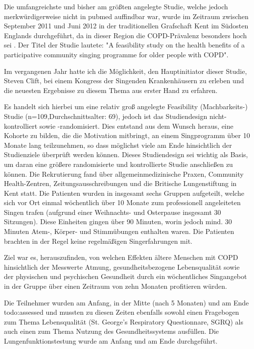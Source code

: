 Die umfangreichste und bisher am größten angelegte Studie, welche jedoch merkwürdigerweise nicht in pubmed auffindbar war, wurde im Zeitraum zwischen September 2011 und Juni 2012 in der traditionellen Grafschaft Kent im Südosten Englands durchgeführt, da in dieser Region die COPD-Prävalenz besonders hoch sei \autocite[vgl.][4]{clift2013}. Der Titel der Studie lautete: "A feasibility study on the health benefits of a participative community singing programme for older people with COPD".

Im vergangenen Jahr hatte ich die Möglichkeit, den Hauptinitiator dieser Studie, Steven Clift, bei einem Kongress der Singenden Krankenhäusern zu erleben und die neuesten Ergebnisse zu diesem Thema aus erster Hand zu erfahren. 

Es handelt sich hierbei um eine relativ groß angelegte Feasibility (Machbarkeits-) Studie (n=109,Durchschnittsalter: 69), jedoch ist das Studiendesign nicht-kontrolliert sowie -randomisiert. Dies entstand aus dem Wunsch heraus, eine Kohorte zu bilden, die die Motivation mitbringt, an einem Singprogramm über 10 Monate lang teilzunehmen, so dass möglichst viele am Ende hinsichtlich der Studienziele überprüft werden können. Dieses Studiendesign sei wichtig als Basis, um daran eine größere randomisierte und kontrollierte Studie anschließen zu können. Die Rekrutierung fand über allgemeinmedizinische Praxen, Community Health-Zentren, Zeitungsausschreibungen und die Britische Lungenstiftung in Kent statt. Die Patienten wurden in insgesamt sechs Gruppen aufgeteilt, welche sich vor Ort einmal wöchentlich über 10 Monate zum professionell angeleiteten Singen trafen (aufgrund einer Weihnachts- und Osterpause insgesamt 30 Sitzungen). Diese Einheiten gingen über 90 Minuten, worin jedoch mind. 30 Minuten Atem-, Körper- und Stimmübungen enthalten waren. Die Patienten brachten in der Regel keine regelmäßigen Singerfahrungen mit.

Ziel war es, herauszufinden, von welchen Effekten ältere Menschen mit COPD hinsichtlich der Messwerte Atmung, gesundheitsbezogene Lebensqualität sowie der physischen und psychischen Gesundheit durch ein wöchentliches Singangebot in der Gruppe über einen Zeitraum von zehn Monaten profitieren würden. 

Die Teilnehmer wurden am Anfang, in der Mitte (nach 5 Monaten) und am Ende todo:assessed und mussten zu diesen Zeiten ebenfalls sowohl einen Fragebogen zum Thema Lebensqualität (St. George's Respiratory Questionnare, SGRQ) als auch einen zum Thema Nutzung des Gesundheitssystems ausfüllen. Die Lungenfunktionstestung wurde am Anfang und am Ende durchgeführt. 

